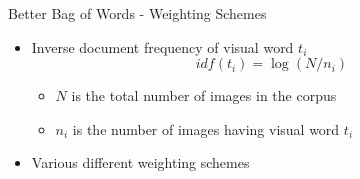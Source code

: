 \begin{frame}{Better Bag of Words - Weighting Schemes \cite{yang2007evaluating}}
	\begin{itemize}
		\item Inverse document frequency of visual word $t_i$
				\begin{equation}
				idf(t_i) = \log(N / n_i)
				\end{equation}

				\begin{itemize}
					\item $N$ is the total number of images in the corpus
					\item $n_i$ is the number of images having visual word $t_i$
				\end{itemize}

		\item Various different weighting schemes
			
			\begin{table}[!ht]
	        \begin{center}

	        \end{center}
	        \caption{Weighting schemes for visual-word feature \cite{yang2007evaluating}}
	    	\end{table}

	\end{itemize}
\end{frame}

